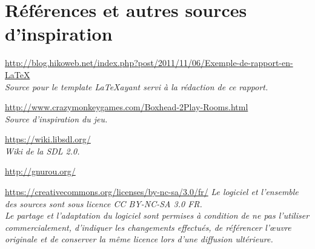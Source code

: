 \section*{Références et autres sources d'inspiration}
	
\url{http://blog.hikoweb.net/index.php?post/2011/11/06/Exemple-de-rapport-en-LaTeX} \\
\emph{Source pour le template \LaTeX ayant servi à la rédaction de ce rapport.}

\url{http://www.crazymonkeygames.com/Boxhead-2Play-Rooms.html} \\
\emph{Source d'inspiration du jeu.}

\url{https://wiki.libsdl.org/} \\
\emph{Wiki de la SDL 2.0.}

\url{http://gnurou.org/} \\
\emph{}

\url{}

\url{https://creativecommons.org/licenses/by-nc-sa/3.0/fr/}
\emph{Le logiciel et l'ensemble des sources sont sous licence CC BY-NC-SA 3.0 FR. \\
Le partage et l'adaptation du logiciel sont permises à condition de ne pas l'utiliser
commercialement, d'indiquer les changements effectués, de référencer l’œuvre originale et 
de conserver la même licence lors d'une diffusion ultérieure.}

